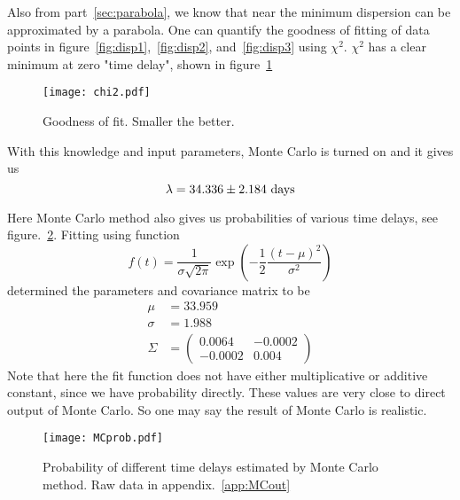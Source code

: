 Also from part~\ref{sec:parabola}, we know that near the minimum dispersion can be approximated by a parabola. One can quantify the goodness of fitting of data points in figure~\ref{fig:disp1},~\ref{fig:disp2}, and~\ref{fig:disp3} using $\chi^2$. $\chi^2$ has a clear minimum at zero "time delay", shown in figure~\ref{fig:chi2}
\begin{figure}[ht]
	\centering
	\texttt{[image: chi2.pdf]}
	\caption{Goodness of fit. Smaller the better.}%
	\label{fig:chi2}
\end{figure}

With this knowledge and input parameters, Monte Carlo is turned on and it gives us
\begin{equation}
	\lambda = \num{34.336 +- 2.184} \text{ days}
\end{equation}

Here Monte Carlo method also gives us probabilities of various time delays, see figure.~\ref{fig:MCprob}. Fitting using function
\begin{equation*}
	f(t) = \frac{1}{\sigma \sqrt{2\pi}} \exp(-\frac{1}{2} \frac{(t-\mu)^2}{\sigma^2}) 
\end{equation*}
determined the parameters and covariance matrix to be
\begin{align*}
	\mu &= 33.959 \\
	\sigma &= 1.988 \\
	\Sigma &= \begin{pmatrix} 0.0064 & -0.0002 \\ -0.0002 & 0.004 \end{pmatrix}
\end{align*}
Note that here the fit function does not have either multiplicative or additive constant, since we have probability directly. These values are very close to direct output of Monte Carlo. So one may say the result of Monte Carlo is realistic.
\begin{figure}[ht]
	\centering
	\texttt{[image: MCprob.pdf]}
	\caption{Probability of different time delays estimated by Monte Carlo method. Raw data in appendix.~\ref{app:MCout}}%
	\label{fig:MCprob}
\end{figure}

